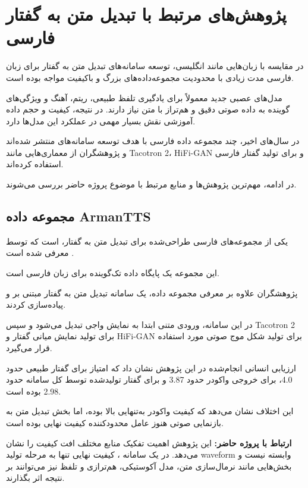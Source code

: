 \section{پژوهش‌های مرتبط با تبدیل متن به گفتار فارسی}

در مقایسه با زبان‌هایی مانند انگلیسی، توسعه سامانه‌های
تبدیل متن به گفتار برای زبان فارسی مدت زیادی با محدودیت
مجموعه‌داده‌های بزرگ و باکیفیت مواجه بوده است.

مدل‌های عصبی جدید  معمولاً برای یادگیری تلفظ طبیعی،
ریتم، آهنگ و ویژگی‌های گوینده به داده صوتی دقیق و هم‌تراز
با متن نیاز دارند.
در نتیجه، کیفیت و حجم داده آموزشی نقش بسیار مهمی در عملکرد
این مدل‌ها دارد.

در سال‌های اخیر، چند مجموعه داده فارسی با هدف توسعه
سامانه‌های  منتشر شده‌اند و پژوهشگران از معماری‌هایی مانند
Tacotron 2، HiFi-GAN و  برای تولید گفتار فارسی استفاده
کرده‌اند.

در ادامه، مهم‌ترین پژوهش‌ها و منابع مرتبط با موضوع پروژه حاضر
بررسی می‌شوند.


\subsection{مجموعه داده ArmanTTS}

یکی از مجموعه‌های فارسی طراحی‌شده برای تبدیل متن به گفتار،
است که توسط
معرفی شده است
\cite{shamgholi2023armantts}.

این مجموعه یک پایگاه داده تک‌گوینده
برای زبان فارسی است.

پژوهشگران علاوه بر معرفی مجموعه داده، یک سامانه تبدیل متن
به گفتار مبتنی بر
و
پیاده‌سازی کردند.

در این سامانه، ورودی متنی ابتدا به نمایش واجی تبدیل می‌شود
و سپس Tacotron 2 برای تولید نمایش میانی گفتار و HiFi-GAN
برای تولید شکل موج صوتی مورد استفاده قرار می‌گیرد.

ارزیابی انسانی انجام‌شده در این پژوهش نشان داد که امتیاز
برای گفتار طبیعی حدود 4.0، برای خروجی واکودر حدود 3.87
و برای گفتار تولیدشده توسط کل سامانه حدود 2.98 بوده است.

این اختلاف نشان می‌دهد که کیفیت واکودر به‌تنهایی بالا بوده،
اما بخش تبدیل متن به بازنمایی صوتی هنوز عامل محدودکننده
کیفیت نهایی بوده است.

\textbf{ارتباط با پروژه حاضر:}
این پژوهش اهمیت تفکیک منابع مختلف افت کیفیت را نشان می‌دهد.
در یک سامانه ، کیفیت نهایی تنها به مرحله تولید waveform
وابسته نیست و بخش‌هایی مانند نرمال‌سازی متن، مدل آکوستیکی،
هم‌ترازی و تلفظ نیز می‌توانند بر نتیجه اثر بگذارند.


